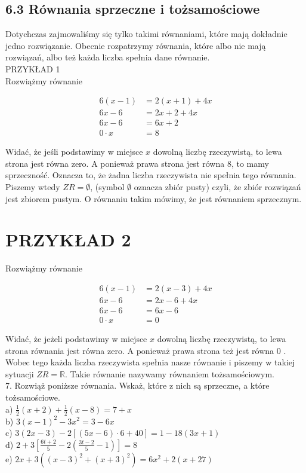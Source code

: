 \documentclass[10pt]{article}
\begin{document}
\subsection*{6.3 Równania sprzeczne i tożsamościowe}
Dotychczas zajmowaliśmy się tylko takimi równaniami, które mają dokładnie jedno rozwiązanie. Obecnie rozpatrzymy równania, które albo nie mają rozwiązań, albo też każda liczba spełnia dane równanie.\\
PRZYKŁAD 1\\
Rozwiążmy równanie

\[
\begin{aligned}
6(x-1) & =2(x+1)+4 x \\
6 x-6 & =2 x+2+4 x \\
6 x-6 & =6 x+2 \\
0 \cdot x & =8
\end{aligned}
\]

Widać, że jeśli podstawimy w miejsce \(x\) dowolną liczbę rzeczywistą, to lewa strona jest równa zero. A ponieważ prawa strona jest równa 8, to mamy sprzeczność. Oznacza to, że żadna liczba rzeczywista nie spełnia tego równania. Piszemy wtedy \(Z R=\emptyset\), (symbol \(\emptyset\) oznacza zbiór pusty) czyli, że zbiór rozwiązań jest zbiorem pustym. O równaniu takim mówimy, że jest równaniem sprzecznym.

\section*{PRZYKŁAD 2}
Rozwiążmy równanie

\[
\begin{aligned}
6(x-1) & =2(x-3)+4 x \\
6 x-6 & =2 x-6+4 x \\
6 x-6 & =6 x-6 \\
0 \cdot x & =0
\end{aligned}
\]

Widać, że jeżeli podstawimy w miejsce \(x\) dowolną liczbę rzeczywistą, to lewa strona równania jest równa zero. A ponieważ prawa strona też jest równa 0 . Wobec tego każda liczba rzeczywista spełnia nasze równanie i piszemy w takiej sytuacji \(Z R=\mathbb{R}\). Takie równanie nazywamy równaniem tożsamościowym.\\
7. Rozwiąż poniższe równania. Wskaż, które z nich są sprzeczne, a które tożsamościowe.\\
a) \(\frac{1}{2}(x+2)+\frac{1}{2}(x-8)=7+x\)\\
b) \(3(x-1)^{2}-3 x^{2}=3-6 x\)\\
c) \(3(2 x-3)-2[(5 x-6) \cdot 6+40]=1-18(3 x+1)\)\\
d) \(2+3\left[\frac{6 t+2}{5}-2\left(\frac{3 t-2}{5}-1\right)\right]=8\)\\
e) \(2 x+3\left((x-3)^{2}+(x+3)^{2}\right)=6 x^{2}+2(x+27)\)
\end{document}
